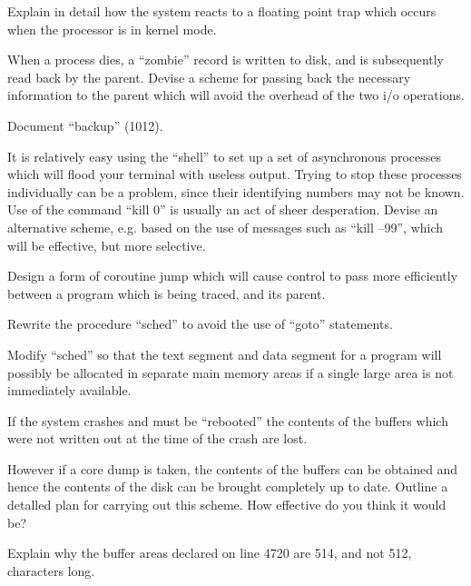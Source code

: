 
\bd
\item[2.1] Explain in detail how the system
reacts to a floating point trap which
occurs when the processor is in kernel
mode.

\item[2.2] When a process dies, a ``zombie''
record is written to disk, and is
subsequently read back by the parent. Devise a scheme for passing back the
necessary information to the parent
which will avoid the overhead of the
two i/o operations.

\item[2.3] Document ``backup'' (1012).

\item[2.4] It is relatively easy using the
``shell'' to set up a set of asynchronous
processes which will flood your terminal with useless output. Trying to stop
these processes individually can be a
problem, since their identifying
numbers may not be known. Use of the
command ``kill 0'' is usually an act of
sheer desperation. Devise an alternative scheme, e.g. based on the use of
messages such as ``kill --99'', which will
be effective, but more selective.

\item[2.5] Design a form of coroutine jump
which will cause control to pass more
efficiently between a program which is
being traced, and its parent.
\ed


\bd
\item[3.1] Rewrite the procedure ``sched'' to
avoid the use of ``goto'' statements.

\item[3.2] Modify ``sched'' so that the text
segment and data segment for a program
will possibly be allocated in separate
main memory areas if a single large
area is not immediately available.

\item[3.3] If the system crashes and must be
``rebooted'' the contents of the buffers
which were not written out at the time
of the crash are lost.

However if a core dump is taken,
the contents of the buffers can be
obtained and hence the contents of the
disk can be brought completely up to
date. Outline a detalled plan for carrying out this scheme.
How effective do you think it would be?

\item[3.4] Explain why the buffer areas
declared on line 4720 are 514, and not
512, characters long.

